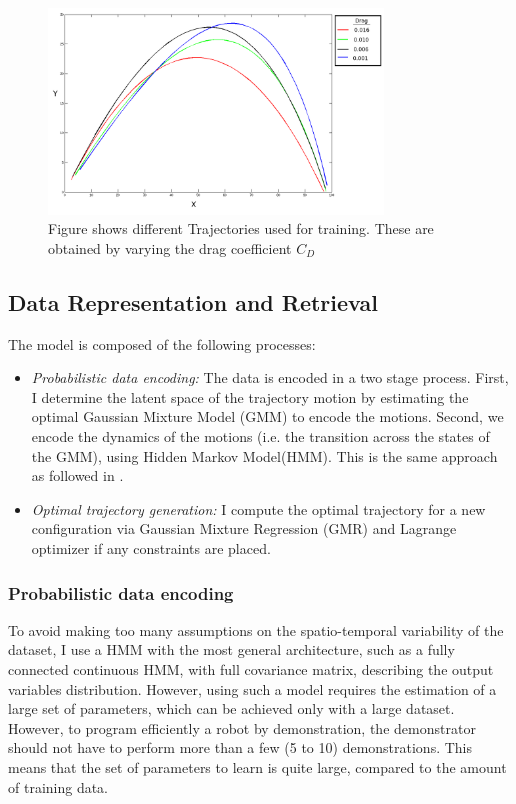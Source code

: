 \documentclass[conference]{IEEEtran}
\begin{document}
\begin{figure}[!t]
\centering
\includegraphics[width=3.5in]{fig2}
\caption{Figure shows different Trajectories used for training. These are obtained by varying the drag coefficient $C_{D}$}
\label{fig:fig2}
\end{figure}

\subsection{Data Representation and Retrieval}
The model is composed of the following processes:
\begin{itemize}
\item{
    \emph{Probabilistic data encoding:} The data is encoded in a two stage process. First, I determine the latent space of the trajectory motion by estimating the optimal Gaussian Mixture Model (GMM) to encode the motions. Second, we encode the dynamics of the motions (i.e. the transition across the states of the GMM), using Hidden Markov Model(HMM). This is the same approach as followed in \cite{ref:7}.
}    
\item{
    \emph{Optimal trajectory generation:} I compute the optimal trajectory for a new configuration via Gaussian Mixture Regression (GMR) and Lagrange optimizer if any constraints are placed.
}    
\end{itemize}

\subsubsection{Probabilistic data encoding}
To avoid making too many assumptions on the spatio-temporal variability of the dataset, I use a HMM with the most general architecture, such as a fully connected continuous HMM, with full covariance matrix, describing the output variables distribution. However, using such a model requires the estimation of a large set of parameters, which can be achieved only with a large dataset. However, to program efficiently a robot by demonstration, the demonstrator should not have to perform more than a few (5 to 10) demonstrations. This means that the set of parameters to learn is quite large, compared to the amount of training data. 
\end{document}
